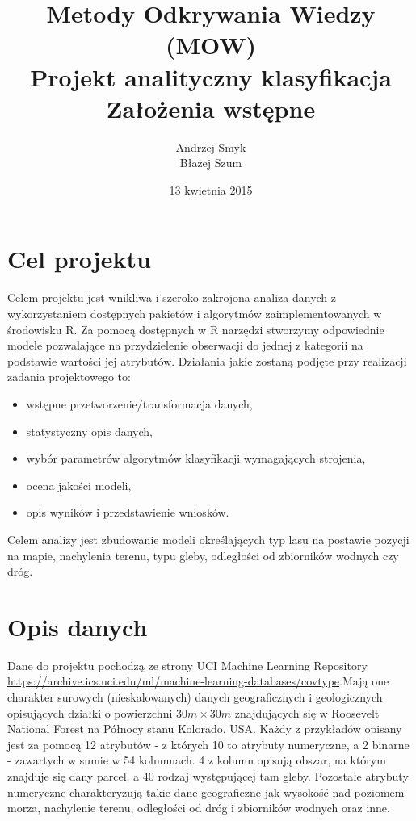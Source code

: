 \documentclass[a4paper,10pt]{article}
\title{Metody Odkrywania Wiedzy (MOW)\\Projekt analityczny klasyfikacja\\Założenia wstępne}
\author{Andrzej Smyk\\Błażej Szum}
\date{13 kwietnia 2015}
\begin{document}
	\maketitle
	
	\section{Cel projektu}
	Celem projektu jest wnikliwa i szeroko zakrojona analiza danych z wykorzystaniem dostępnych pakietów i algorytmów zaimplementowanych w środowisku R. Za pomocą dostępnych w R narzędzi stworzymy odpowiednie modele pozwalające na przydzielenie obserwacji do jednej z kategorii na podstawie wartości jej atrybutów. Działania jakie zostaną podjęte przy realizacji zadania projektowego to:
	\begin{itemize}
		\item wstępne przetworzenie/transformacja danych,
		\item statystyczny opis danych,
		\item wybór parametrów algorytmów klasyfikacji wymagających strojenia,
		\item ocena jakości modeli,
		\item opis wyników i przedstawienie wniosków.
	\end{itemize}
 	Celem analizy jest zbudowanie modeli określających typ lasu na postawie pozycji na mapie, nachylenia terenu, typu gleby, odległości od zbiorników wodnych czy dróg.

	\section{Opis danych}
	Dane do projektu pochodzą ze strony UCI Machine Learning Repository \linebreak\mbox{\url{https://archive.ics.uci.edu/ml/machine-learning-databases/covtype}}.\linebreak Mają one charakter surowych (nieskalowanych) danych geograficznych i geologicznych opisujących działki o powierzchni \mbox{$30 m \times 30 m$} znajdujących się w \mbox{Roosevelt} National Forest na Północy stanu Kolorado, USA. Każdy z przykładów opisany jest za pomocą 12 atrybutów - z których 10 to atrybuty numeryczne, a 2 binarne - zawartych w sumie w 54 kolumnach. 4 z kolumn opisują obszar, na którym znajduje się dany parcel, a 40 rodzaj występującej tam gleby. Pozostałe atrybuty numeryczne charakteryzują takie dane geograficzne jak wysokość nad poziomem morza, nachylenie terenu, odległości od dróg i zbiorników wodnych oraz inne.
\end{document}
